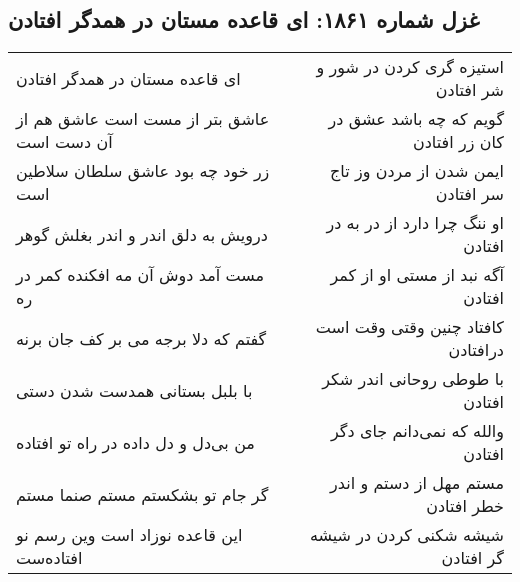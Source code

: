 \begin{center}
\section*{غزل شماره ۱۸۶۱: ای قاعده مستان در همدگر افتادن}
\label{sec:1861}
\begin{longtable}{l p{0.5cm} r}
ای قاعده مستان در همدگر افتادن
&&
استیزه گری کردن در شور و شر افتادن
\\
عاشق بتر از مست است عاشق هم از آن دست است
&&
گویم که چه باشد عشق در کان زر افتادن
\\
زر خود چه بود عاشق سلطان سلاطین است
&&
ایمن شدن از مردن وز تاج سر افتادن
\\
درویش به دلق اندر و اندر بغلش گوهر
&&
او ننگ چرا دارد از در به در افتادن
\\
مست آمد دوش آن مه افکنده کمر در ره
&&
آگه نبد از مستی او از کمر افتادن
\\
گفتم که دلا برجه می بر کف جان برنه
&&
کافتاد چنین وقتی وقت است درافتادن
\\
با بلبل بستانی همدست شدن دستی
&&
با طوطی روحانی اندر شکر افتادن
\\
من بی‌دل و دل داده در راه تو افتاده
&&
والله که نمی‌دانم جای دگر افتادن
\\
گر جام تو بشکستم مستم صنما مستم
&&
مستم مهل از دستم و اندر خطر افتادن
\\
این قاعده نوزاد است وین رسم نو افتاده‌ست
&&
شیشه شکنی کردن در شیشه گر افتادن
\\
\end{longtable}
\end{center}
